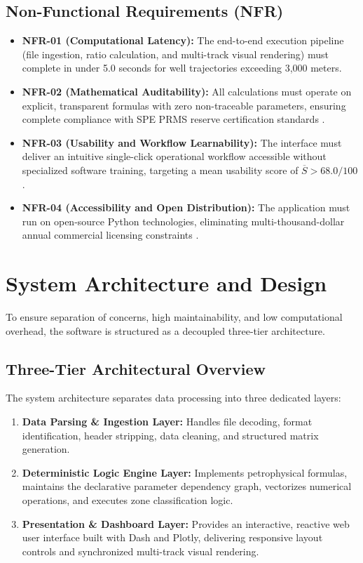 \subsection{Non-Functional Requirements (NFR)}
\begin{itemize}
    \item \textbf{NFR-01 (Computational Latency):} The end-to-end execution pipeline (file ingestion, ratio calculation, and multi-track visual rendering) must complete in under 5.0 seconds for well trajectories exceeding 3,000 meters.
    \item \textbf{NFR-02 (Mathematical Auditability):} All calculations must operate on explicit, transparent formulas with zero non-traceable parameters, ensuring complete compliance with SPE PRMS reserve certification standards \citep{ref3}.
    \item \textbf{NFR-03 (Usability and Workflow Learnability):} The interface must deliver an intuitive single-click operational workflow accessible without specialized software training, targeting a mean usability score of $\overline{S} > 68.0/100$.
    \item \textbf{NFR-04 (Accessibility and Open Distribution):} The application must run on open-source Python technologies, eliminating multi-thousand-dollar annual commercial licensing constraints \citep{wood2020}.
\end{itemize}

\section{System Architecture and Design}

To ensure separation of concerns, high maintainability, and low computational overhead, the software is structured as a decoupled three-tier architecture.

\subsection{Three-Tier Architectural Overview}
\noindent The system architecture separates data processing into three dedicated layers:
\begin{enumerate}
    \item \textbf{Data Parsing \& Ingestion Layer:} Handles file decoding, format identification, header stripping, data cleaning, and structured matrix generation.
    \item \textbf{Deterministic Logic Engine Layer:} Implements petrophysical formulas, maintains the declarative parameter dependency graph, vectorizes numerical operations, and executes zone classification logic.
    \item \textbf{Presentation \& Dashboard Layer:} Provides an interactive, reactive web user interface built with Dash and Plotly, delivering responsive layout controls and synchronized multi-track visual rendering.
\end{enumerate}

